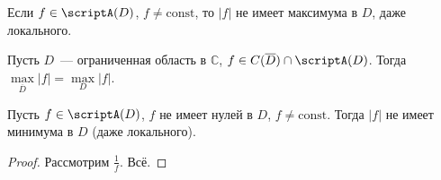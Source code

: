 \documentclass{article}
\begin{document}
    \begin{corollary}
        Если $f\in\scriptA(D)$, $f\neq\mathrm{const}$, то $|f|$ не имеет максимума в $D$, даже локального.
    \end{corollary}
    \begin{corollary}
        Пусть $D$~--- ограниченная область в $\mathbb C$, $f\in C(\overline D)\cap\scriptA(D)$. Тогда $\max\limits_{\overline D}|f|=\max\limits_D|f|$.
    \end{corollary}
    \begin{corollary}
        Пусть $f\in\scriptA(D)$, $f$ не имеет нулей в $D$, $f\neq\mathrm{const}$. Тогда $|f|$ не имеет минимума в $D$ (даже локального).
    \end{corollary}
    \begin{proof}
        Рассмотрим $\frac1f$. Всё.
    \end{proof}
\end{document}
